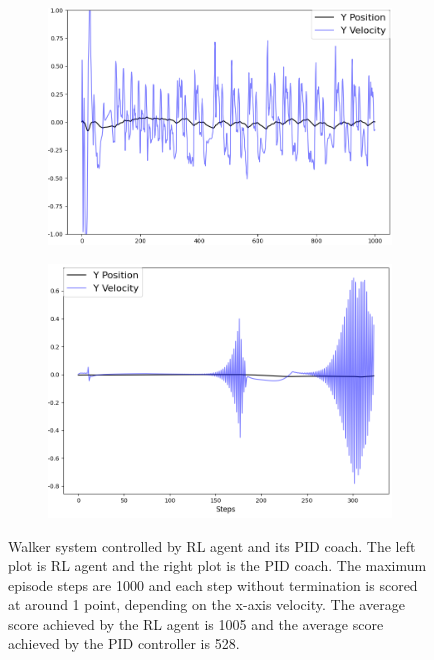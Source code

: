 \documentclass[journal]{IEEEtran}
\begin{document}
\begin{figure}
\centering
\begin{subfigure}{0.24\textwidth}
  \centering
  \includegraphics[width=\linewidth]{walker_RL.png}
\end{subfigure}
\hfill
\begin{subfigure}{.24\textwidth}
  \centering
  \includegraphics[width=\linewidth]{walker_PID.png}
\end{subfigure}
\caption{Walker system controlled by RL agent and its PID coach. The left plot is RL agent and the right plot is the PID coach. The maximum episode steps are 1000 and each step without termination is scored at around 1 point, depending on the x-axis velocity. The average score achieved by the RL agent is 1005 and the average score achieved by the PID controller is 528.}
\label{fig:walker}
\end{figure}
\end{document}
